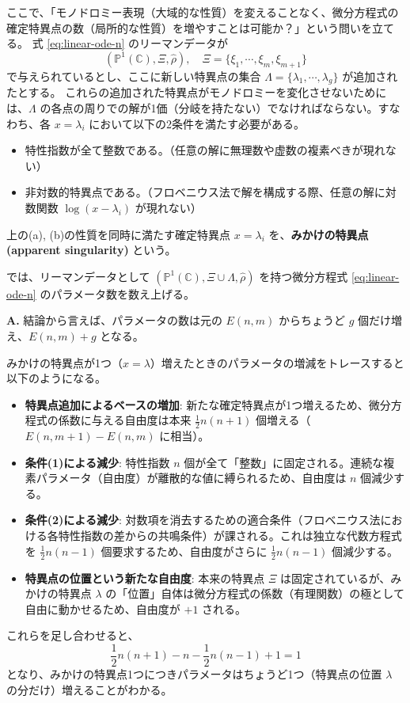 ここで、「モノドロミー表現（大域的な性質）を変えることなく、微分方程式の確定特異点の数（局所的な性質）を増やすことは可能か？」という問いを立てる。
式 \eqref{eq:linear-ode-n} のリーマンデータが
\[
(\mathbb{P}^{1}(\mathbb{C}),\Xi,\hat{\rho}), \quad \Xi=\{\xi_{1},\cdots,\xi_{m},\xi_{m+1}\}
\]
で与えられているとし、ここに新しい特異点の集合 $\Lambda=\{\lambda_{1},\cdots,\lambda_{g}\}$ が追加されたとする。
これらの追加された特異点がモノドロミーを変化させないためには、$\Lambda$ の各点の周りでの解が1価（分岐を持たない）でなければならない。すなわち、各 $x=\lambda_{i}$ において以下の2条件を満たす必要がある。
\begin{itemize}
    \item[(a)] 特性指数が全て整数である。（任意の解に無理数や虚数の複素べきが現れない）
    \item[(b)] 非対数的特異点である。（フロベニウス法で解を構成する際、任意の解に対数関数 $\log(x-\lambda_{i})$ が現れない）
\end{itemize}

\begin{definition}[みかけの特異点]
    上の(a), (b)の性質を同時に満たす確定特異点 $x=\lambda_{i}$ を、\textbf{みかけの特異点 (apparent singularity)} という。
\end{definition}

では、リーマンデータとして $(\mathbb{P}^{1}(\mathbb{C}),\Xi\cup\Lambda,\hat{\rho})$ を持つ微分方程式 \eqref{eq:linear-ode-n} のパラメータ数を数え上げる。

\begin{Q}
\textbf{A.} 結論から言えば、パラメータの数は元の $E(n,m)$ からちょうど $g$ 個だけ増え、$E(n,m)+g$ となる。

みかけの特異点が1つ（$x=\lambda$）増えたときのパラメータの増減をトレースすると以下のようになる。
\begin{itemize}
    \item \textbf{特異点追加によるベースの増加}: 新たな確定特異点が1つ増えるため、微分方程式の係数に与える自由度は本来 $\frac{1}{2}n(n+1)$ 個増える（$E(n,m+1)-E(n,m)$ に相当）。
    \item \textbf{条件(1)による減少}: 特性指数 $n$ 個が全て「整数」に固定される。連続な複素パラメータ（自由度）が離散的な値に縛られるため、自由度は $n$ 個減少する。
    \item \textbf{条件(2)による減少}: 対数項を消去するための適合条件（フロベニウス法における各特性指数の差からの共鳴条件）が課される。これは独立な代数方程式を $\frac{1}{2}n(n-1)$ 個要求するため、自由度がさらに $\frac{1}{2}n(n-1)$ 個減少する。
    \item \textbf{特異点の位置という新たな自由度}: 本来の特異点 $\Xi$ は固定されているが、みかけの特異点 $\lambda$ の「位置」自体は微分方程式の係数（有理関数）の極として自由に動かせるため、自由度が $+1$ される。
\end{itemize}
これらを足し合わせると、
\[
\frac{1}{2}n(n+1) - n - \frac{1}{2}n(n-1) + 1 = 1
\]
となり、みかけの特異点1つにつきパラメータはちょうど1つ（特異点の位置 $\lambda$ の分だけ）増えることがわかる。
\end{Q}

